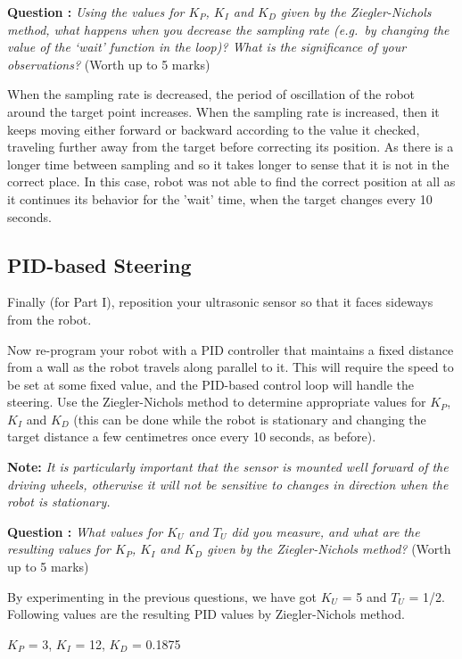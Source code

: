 \documentclass[hidelinks,a4paper,11pt]{article}
\newcounter{question}
\newcommand\myq{\refstepcounter{question}\thequestion}
\begin{document}
	{\bfseries Question \myq:}  \emph{Using the values for $K_P$, $K_I$ and $K_D$ given by the Ziegler-Nichols method, what happens when you decrease the sampling rate (e.g.\ by changing the value of the `wait' function in the loop)?  What is the significance of your observations?} (Worth up to 5 marks)\\
	\begin{mdframed}
		When the sampling rate is decreased, the period of oscillation of the robot around the target point increases. When the sampling rate is increased, then it keeps moving either forward or backward according to the value it checked, traveling further away from the target before correcting its position. As there is a longer time between sampling and so it takes longer to sense that it is not in the correct place. In this case, robot was not able to find the correct position at all as it continues its behavior for the 'wait' time, when the target changes every 10 seconds.
	\end{mdframed}
	\vspace*{\baselineskip}
	
	
	\subsection{PID-based Steering}
	
	Finally (for Part I), reposition your ultrasonic sensor so that it faces sideways from the robot.
	
	Now re-program your robot with a PID controller that maintains a fixed distance from a wall as the robot travels along parallel to it.  This will require the speed to be set at some fixed value, and the PID-based control loop will handle the steering.  Use the Ziegler-Nichols method to determine appropriate values for $K_P$, $K_I$ and $K_D$ (this can be done while the robot is stationary and changing the target distance a few centimetres once every 10 seconds, as before).
	
	{\bfseries Note:}  \emph{It is particularly important that the sensor is mounted well forward of the driving wheels, otherwise it will not be sensitive to changes in direction when the robot is stationary.}
	
	{\bfseries Question \myq:}  \emph{What values for $K_U$ and $T_U$ did you measure, and what are the resulting values for $K_P$, $K_I$ and $K_D$  given by the Ziegler-Nichols method?} (Worth up to 5 marks)\\
	\begin{mdframed}
		By experimenting in the previous questions, we have got $K_U$ = 5 and $T_U$ = 1/2. Following values are the resulting PID values by Ziegler-Nichols method. 
		
		$K_P$ = 3, $K_I$  = 12, $K_D$  = 0.1875
	\end{mdframed}
	\vspace*{\baselineskip}
	
\end{document}
